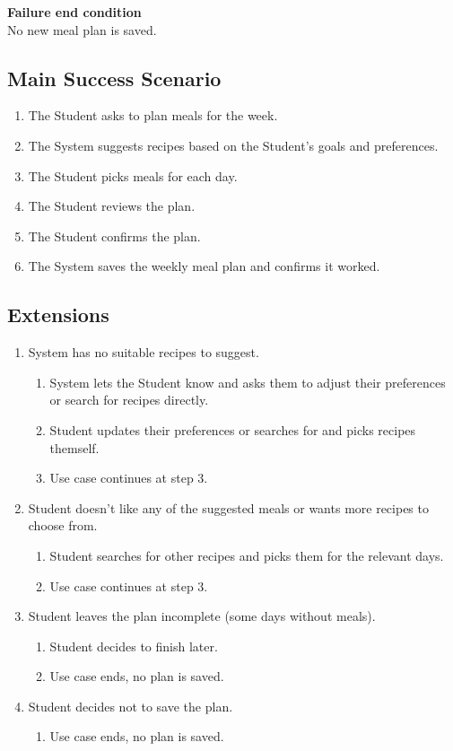 \documentclass[10pt,letterpaper]{article}
\begin{document}
\textbf{Failure end condition}\\
No new meal plan is saved.

\subsection*{Main Success Scenario}
\begin{enumerate}
    \item The Student asks to plan meals for the week.
    \item The System suggests recipes based on the Student's goals and preferences.
    \item The Student picks meals for each day.
    \item The Student reviews the plan.
    \item The Student confirms the plan.
    \item The System saves the weekly meal plan and confirms it worked.
\end{enumerate}
\subsection*{Extensions}
\begin{enumerate}
    \item[2a.] System has no suitable recipes to suggest.
    \begin{enumerate}
        \item[1.] System lets the Student know and asks them to adjust their preferences or search for recipes directly.
        \item[2.] Student updates their preferences or searches for and picks recipes themself.
        \item[3.] Use case continues at step 3.
    \end{enumerate}
    \item[3a.] Student doesn't like any of the suggested meals or wants more recipes to choose from.
    \begin{enumerate}
        \item[1.] Student searches for other recipes and picks them for the relevant days.
        \item[2.] Use case continues at step 3.
    \end{enumerate}
    \item[4a.] Student leaves the plan incomplete (some days without meals).
    \begin{enumerate}
        \item[1.] Student decides to finish later.
        \item[2.] Use case ends, no plan is saved.
    \end{enumerate}
    \item[5a.] Student decides not to save the plan.
    \begin{enumerate}
        \item[1.] Use case ends, no plan is saved.
    \end{enumerate}
\end{enumerate}
\end{document}
